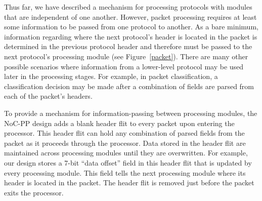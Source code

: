 %

Thus far, we have described a mechanism for processing protocols with modules that are independent of one another.
However, packet processing requires at least some information to be passed from one protocol to another.
As a bare minimum, information regarding where the next protocol's header is located in the packet is determined in the previous protocol header and therefore must be passed to the next protocol's processing module (see Figure~\ref{packet}).
There are many other possible scenarios where information from a lower-level protocol may be used later in the processing stages.
For example, in packet classification, a classification decision may be made after a combination of fields are parsed from each of the packet's headers.

To provide a mechanism for information-passing between processing modules, the NoC-PP design adds a blank header flit to every packet upon entering the processor.
This header flit can hold any combination of parsed fields from the packet as it proceeds through the processor.
Data stored in the header flit are maintained across processing modules until they are overwritten.
For example, our design stores a 7-bit ``data offset'' field in this header flit that is updated by every processing module.
This field tells the next processing module where its header is located in the packet.
The header flit is removed just before the packet exits the processor.
